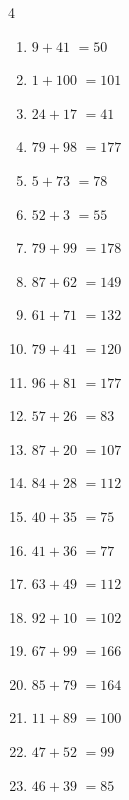 \begin{multicols}{4}
\begin{enumerate}
  \item $9+41$
        $=50$

  \item $1+100$
        $=101$

  \item $24+17$
        $=41$

  \item $79+98$
        $=177$

  \item $5+73$
        $=78$

  \item $52+3$
        $=55$

  \item $79+99$
        $=178$

  \item $87+62$
        $=149$

  \item $61+71$
        $=132$

  \item $79+41$
        $=120$

  \item $96+81$
        $=177$

  \item $57+26$
        $=83$

  \item $87+20$
        $=107$

  \item $84+28$
        $=112$

  \item $40+35$
        $=75$

  \item $41+36$
        $=77$

  \item $63+49$
        $=112$

  \item $92+10$
        $=102$

  \item $67+99$
        $=166$

  \item $85+79$
        $=164$

  \item $11+89$
        $=100$

  \item $47+52$
        $=99$

  \item $46+39$
        $=85$

\columnbreak %


\end{enumerate}
\end{multicols}
